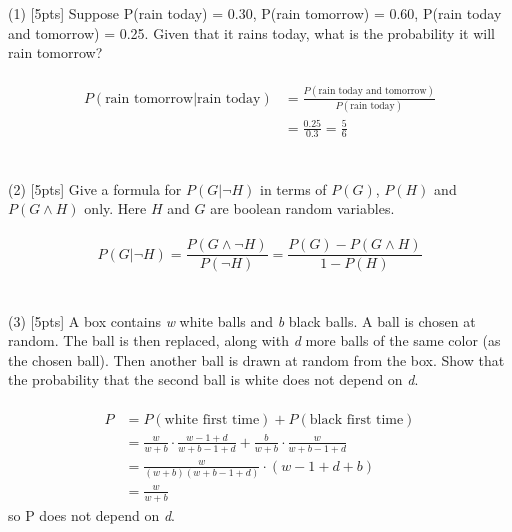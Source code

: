 \documentclass{article}
\begin{document}
(1) [5pts] Suppose P(rain today) = 0.30, P(rain tomorrow) = 0.60,
P(rain today and tomorrow) = 0.25. Given that it rains today, what
is the probability it will rain tomorrow?\\\\
\begin{equation}
\begin{aligned}
    P(\text{rain tomorrow}|\text{rain today})&=\frac{P(\text{rain today and tomorrow})}{P(\text{rain today})}
    \\&=\frac{0.25}{0.3}=\frac{5}{6}
\end{aligned}
\end{equation}
\\\\
(2) [5pts] Give a formula for $P(G | \neg H)$ in terms of $P(G)$,
$P(H)$ and $P(G \wedge H)$ only.  Here $H$ and $G$ are boolean random variables.\\ \\
\begin{equation}
    P(G | \neg H) = \frac{P(G \wedge \neg H)}{P(\neg H)}=\frac{P(G)-P(G \wedge H)}{1-P(H)}
\end{equation}
\\\\
(3) [5pts] A box contains {\it w} white balls and {\it b} black
balls. A ball is chosen at random. The ball is then replaced,
along with {\it d} more balls of the same color (as the chosen
ball). Then another ball is drawn at random from the box. Show
that the probability that the second ball is white does not depend
on {\it d}.  \\\\
\begin{equation}
\begin{aligned}
    P &= P(\text{white first time}) + P(\text{black first time})
    \\&=\frac{w}{w+b} \cdot \frac{w-1+d}{w+b-1+d} + \frac{b}{w+b} \cdot \frac{w}{w+b-1+d}
    \\&=\frac{w}{(w+b)(w+b-1+d)} \cdot (w-1+d+b)
    \\&=\frac{w}{w+b}
\end{aligned}
\end{equation}
so P does not depend on {\it d}.
\end{document}
